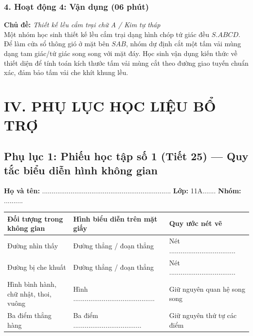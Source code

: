 \documentclass[12pt, a4paper]{article}
\begin{document}
\subsubsection*{4. Hoạt động 4: Vận dụng (06 phút)}
\textbf{Chủ đề:} \textit{Thiết kế lều cắm trại chữ A / Kim tự tháp}\\
Một nhóm học sinh thiết kế lều cắm trại dạng hình chóp tứ giác đều $S.ABCD$. Để làm cửa sổ thông gió ở mặt bên $SAB$, nhóm dự định cắt một tấm vải mùng dạng tam giác/tứ giác song song với mặt đáy. Học sinh vận dụng kiến thức về thiết diện để tính toán kích thước tấm vải mùng cắt theo đường giao tuyến chuẩn xác, đảm bảo tấm vải che khít khung lều.

\newpage

\section*{IV. PHỤ LỤC HỌC LIỆU BỔ TRỢ}

\subsection*{Phụ lục 1: Phiếu học tập số 1 (Tiết 25) --- Quy tắc biểu diễn hình không gian}
\noindent\textbf{Họ và tên:} .................................................................... \textbf{Lớp:} 11A....... \textbf{Nhóm:} ..........

\begin{pedabox}
\begin{center}
\begin{tabularx}{0.95\linewidth}{|p{4.5cm}|X|X|}
\hline
\textbf{Đối tượng trong không gian} & \textbf{Hình biểu diễn trên mặt giấy} & \textbf{Quy ước nét vẽ} \\
\hline
Đường nhìn thấy & Đường thẳng / đoạn thẳng & Nét ................................... \\
\hline
Đường bị che khuất & Đường thẳng / đoạn thẳng & Nét ................................... \\
\hline
Hình bình hành, chữ nhật, thoi, vuông & Hình ........................................... & Giữ nguyên quan hệ song song \\
\hline
Ba điểm thẳng hàng & Ba điểm .................................... & Giữ nguyên thứ tự các điểm \\
\hline
\end{tabularx}
\end{center}
\end{pedabox}
\end{document}
